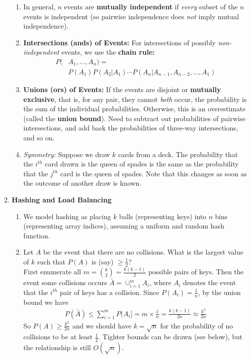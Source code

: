 \documentclass[10pt]{article}
\begin{document}
\begin{multicols}{2}
\begin{enumerate}
\begin{enumerate}
            \item In general, $n$ events are \textbf{mutually independent} if \textit{every} subset of the $n$ events is independent (so pairwise independence does \textit{not} imply mutual independence).
            \item \textbf{Intersections (ands) of Events:} For intersections of possibly \textit{non-independent} events, we use the \textbf{chain rule:} 
            \begin{align*}
            P(&A_1,\hdots,A_n)= \\
            &P(A_1)P(A_2|A_1) \cdots P(A_n|A_{n-1},A_{n-2},\hdots, A_1)
            \end{align*}
            \item \textbf{Unions (ors) of Events:} 
            If the events are disjoint or \textbf{mutually exclusive}, that is, for any pair, they cannot \textit{both} occur, the probability is the sum of the individual probabilities. Otherwise, this is an overestimate (called the \textbf{union bound}). Need to subtract out probabilities of pairwise intersections, and add back the probabilities of three-way intersections, and so on. 
            
            \item \textit{Symmetry:} Suppose we draw $k$ cards from a deck. The probability that the $i^{th}$ card drawn is the queen of spades is the same as the probability that the $j^{th}$ card is the queen of spades. Note that this changes as soon as the outcome of another draw is known.

        \end{enumerate}
        
        \item \textbf{Hashing and Load Balancing} 
        \begin{enumerate}
            \item We model hashing as placing $k$ balls (representing keys) into $n$ bins (representing array indices), assuming a uniform and random hash function. 
            \item Let $A$ be the event that there are no collisions. What is the largest value of $k$ such that $P(A)$ is (say) $\geq \frac{1}{2}$? \\ First enumerate all $m={k \choose 2} = \frac{k(k-1)}{2}$ possible pairs of keys. Then the event some collisions occurs $\bar A = \cup_{i=1}^{m} A_i$, where $A_i$ denotes the event that the $i^{th}$ pair of keys has a collision. Since $P(A_i)=\frac{1}{n}$, by the union bound we have
            \begin{align*}
                P(\bar A) \leq \sum_{i=1}^{m} P(A_i] = m \times \frac{1}{n} = \frac{k(k-1)}{2n} \approx \frac{k^2}{2n}
            \end{align*}
            So $P(A) \geq \frac{k^2}{2n}$ and we should have $k=\sqrt{n}$ for the probability of no collisions to be at least $\frac{1}{2}$. Tighter bounds can be drawn (see below), but the relationship is still $O(\sqrt{n})$.
            

\end{enumerate}
\end{enumerate}
\end{multicols}
\end{document}
